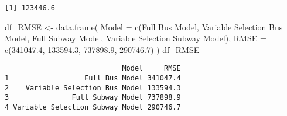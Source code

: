 \documentclass[
  letterpaper,
  DIV=11,
  numbers=noendperiod]{scrartcl}
\newenvironment{Shaded}{\begin{snugshade}}{\end{snugshade}}
\newcommand{\AttributeTok}[1]{\textcolor[rgb]{0.40,0.45,0.13}{#1}}
\newcommand{\DecValTok}[1]{\textcolor[rgb]{0.68,0.00,0.00}{#1}}
\newcommand{\FloatTok}[1]{\textcolor[rgb]{0.68,0.00,0.00}{#1}}
\newcommand{\FunctionTok}[1]{\textcolor[rgb]{0.28,0.35,0.67}{#1}}
\newcommand{\NormalTok}[1]{\textcolor[rgb]{0.00,0.23,0.31}{#1}}
\newcommand{\OtherTok}[1]{\textcolor[rgb]{0.00,0.23,0.31}{#1}}
\newcommand{\SpecialCharTok}[1]{\textcolor[rgb]{0.37,0.37,0.37}{#1}}
\newcommand{\StringTok}[1]{\textcolor[rgb]{0.13,0.47,0.30}{#1}}
\begin{document}
\begin{Shaded}
\end{Shaded}

\begin{verbatim}
[1] 123446.6
\end{verbatim}

\begin{Shaded}
\begin{Highlighting}[]
\NormalTok{df\_RMSE }\OtherTok{\textless{}{-}}
  \FunctionTok{data.frame}\NormalTok{(}
    \AttributeTok{Model =} \FunctionTok{c}\NormalTok{(}\StringTok{\textquotesingle{}Full Bus Model\textquotesingle{}}\NormalTok{, }\StringTok{\textquotesingle{}Variable Selection Bus Model\textquotesingle{}}\NormalTok{, }\StringTok{\textquotesingle{}Full Subway Model\textquotesingle{}}\NormalTok{, }\StringTok{\textquotesingle{}Variable Selection Subway Model\textquotesingle{}}\NormalTok{),}
    \AttributeTok{RMSE =} \FunctionTok{c}\NormalTok{(}\FloatTok{341047.4}\NormalTok{, }\FloatTok{133594.3}\NormalTok{, }\FloatTok{737898.9}\NormalTok{, }\FloatTok{290746.7}\NormalTok{)}
\NormalTok{  )}
\NormalTok{df\_RMSE}
\end{Highlighting}
\end{Shaded}

\begin{verbatim}
                            Model     RMSE
1                  Full Bus Model 341047.4
2    Variable Selection Bus Model 133594.3
3               Full Subway Model 737898.9
4 Variable Selection Subway Model 290746.7
\end{verbatim}
\end{document}
